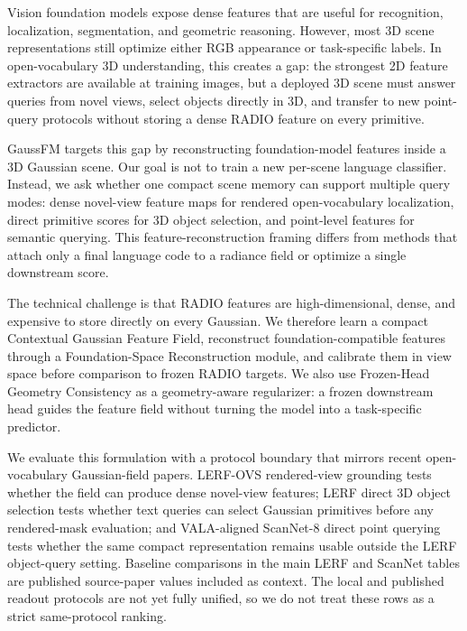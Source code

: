 \documentclass[journal,twoside]{IEEEtran}
\newcommand{\method}{GaussFM}
\begin{document}
Vision foundation models expose dense features that are useful for recognition,
localization, segmentation, and geometric reasoning. However, most 3D scene
representations still optimize either RGB appearance or task-specific labels. In
open-vocabulary 3D understanding, this creates a gap: the strongest 2D feature
extractors are available at training images, but a deployed 3D scene must answer
queries from novel views, select objects directly in 3D, and transfer to new
point-query protocols without storing a dense RADIO feature on every
primitive.

\method{} targets this gap by reconstructing foundation-model features inside a
3D Gaussian scene. Our goal is not to train a new per-scene language classifier.
Instead, we ask whether one compact scene memory can support multiple query
modes: dense novel-view feature maps for rendered open-vocabulary localization,
direct primitive scores for 3D object selection, and point-level features for
semantic querying. This
feature-reconstruction framing differs from
methods that attach only a final language code to a radiance field or optimize a
single downstream score.

The technical challenge is that RADIO features are high-dimensional, dense, and
expensive to store directly on every Gaussian. We therefore learn a compact
Contextual Gaussian Feature Field, reconstruct foundation-compatible features
through a Foundation-Space Reconstruction module, and calibrate them in view
space before comparison to frozen RADIO targets. We also use Frozen-Head
Geometry Consistency as a geometry-aware regularizer: a frozen downstream head
guides the feature field without turning the model into a task-specific
predictor.

We evaluate this formulation with a protocol boundary that mirrors recent
open-vocabulary Gaussian-field papers. LERF-OVS rendered-view grounding tests
whether the field can produce dense novel-view features; LERF direct 3D object
selection tests whether text queries can select Gaussian primitives before any
rendered-mask evaluation; and VALA-aligned ScanNet-8 direct point querying
tests whether the same compact representation remains usable outside the LERF
object-query setting. Baseline comparisons in the main LERF and ScanNet tables
are published source-paper values included as context. The local and published
readout protocols are not yet fully unified, so we do not treat these rows as a
strict same-protocol ranking.
\end{document}
